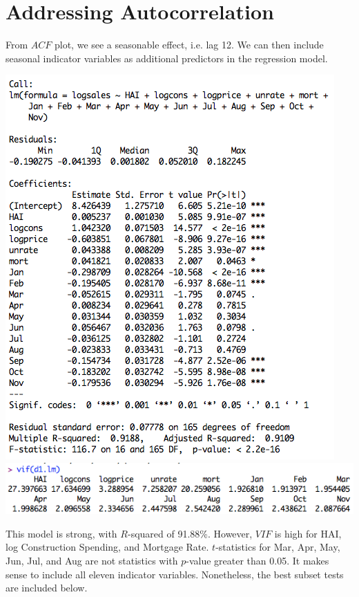 \documentclass[a4 paper, 11 pt]{article}
\begin{document}
\section{Addressing Autocorrelation}
From $ACF$ plot, we see a seasonable effect, i.e. lag 12. We can then include seasonal indicator variables as additional predictors in the regression model.
\begin{center}
\includegraphics[scale=0.5]{reg2} \\
\includegraphics[scale=0.5]{vif2}
\end{center}
This model is strong, with $R$-squared of 91.88\%. However, $VIF$ is high for HAI, log Construction Spending, and Mortgage Rate. $t$-statistics for Mar, Apr, May, Jun, Jul, and Aug are not statistics with $p$-value greater than 0.05. It makes sense to include all eleven indicator variables. Nonetheless, the best subset tests are included below.
\end{document}
